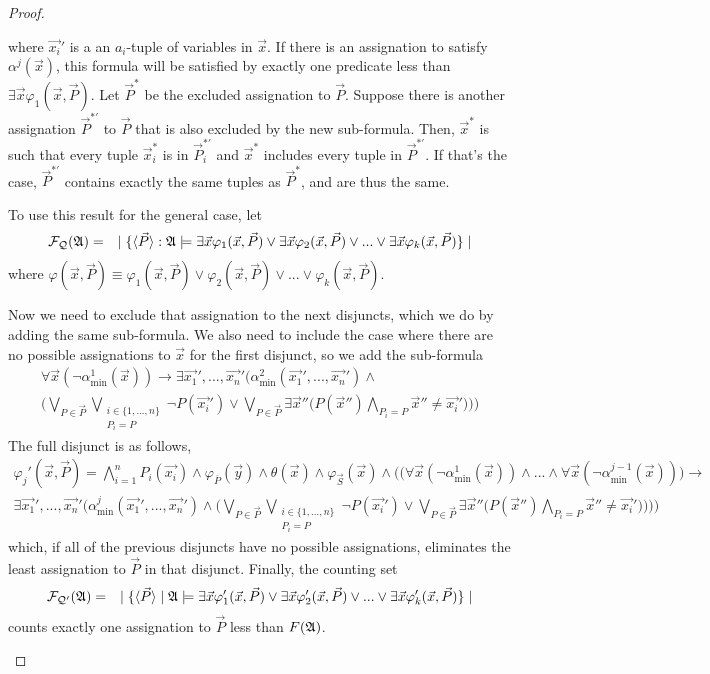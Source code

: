 \documentclass[12pt]{article}
\def\A{{\frak A}}
\def\Q{{\cal Q}}
\def\F{{\cal F}}
\def\P{\vec{P}}
\def\S{\vec{S}}
\def\x{\vec{x}}
\begin{document}
\begin{proof}
\begin{enumerate}
where $\vec{x_i}'$ is a an $a_i$-tuple of variables in $\x$. If there is an assignation to satisfy $\alpha^j(\x)$, this formula will be satisfied by exactly one predicate less than $\exists \x \varphi_1(\x,\P)$. Let $\P^*$ be the excluded assignation to $\P$. Suppose there is another assignation $\P^{*'}$ to $\P$ that is also excluded by the new sub-formula. Then, $\x^*$ is such that every tuple $\x_i^*$ is in $\P_i^{*'}$ and $\x^*$ includes every tuple in $\P^{*'}$. If that's the case, $\P^{*'}$ contains exactly the same tuples as $\P^*$, and are thus the same.

To use this result for the general case, let
\begin{eqnarray*}
\F_\Q(\A) &=& \mid \{ \langle\P\rangle :\A \models 
\exists \x \varphi_1(\x,\P) \vee
\exists \x \varphi_2(\x,\P) \vee
... \vee
\exists \x \varphi_k(\x,\P)
 \} \mid
\end{eqnarray*}
where $\varphi(\x,\P) \equiv \varphi_1(\x,\P) \vee \varphi_2(\x,\P) \vee ...  \vee \varphi_k(\x,\P) $.


Now we need to exclude that assignation to the next disjuncts, which we do by adding the same sub-formula. We also need to include the case where there are no possible assignations to $\x$ for the first disjunct, so we add the sub-formula
\begin{multline*}
\forall\x\left(\neg\alpha^1_{\min}(\x)\right) \to \exists\vec{x_1}',...,\vec{x_n}'\Bigg(\alpha^2_{\min}(\vec{x_1}',...,\vec{x_n}') \wedge \\
\bigg(\bigvee_{P\in\P}\bigvee_{\substack{i\in\{1,...,n\}\\P_i = P}}\neg P(\vec{x_i}') \vee \bigvee_{P\in\P} \exists \x''\Big( P(\x'') \bigwedge_{P_i = P} \x'' \neq \vec{x_i}'\Big) \bigg) \Bigg)
\end{multline*}
The full disjunct is as follows,
\begin{multline*}
\varphi_j'(\x,\P) = \bigwedge_{i=1}^n P_i(\vec{x_i}) \wedge \varphi_{\overline{P}}(\vec{y}) \wedge \theta(\x) \wedge \varphi_{\S}(\x) \wedge \Bigg(\Big(\forall\x\left(\neg\alpha^1_{\min}(\x)\right)\wedge ... \wedge \forall\x\left(\neg\alpha^{j-1}_{\min}(\x)\right)\Big) \to \\ 
\exists\vec{x_1}',...,\vec{x_n}'\Bigg(\alpha^j_{\min}(\vec{x_1}',...,\vec{x_n}') \wedge
\bigg(\bigvee_{P\in\P}\bigvee_{\substack{i\in\{1,...,n\}\\P_i = P}}\neg P(\vec{x_i}') \vee \bigvee_{P\in\P} \exists \x''\Big( P(\x'') \bigwedge_{P_i = P} \x'' \neq \vec{x_i}'\Big) \bigg) \Bigg) \Bigg)
\end{multline*}
which, if all of the previous disjuncts have no possible assignations, eliminates the least assignation to $\P$ in that disjunct. Finally, the counting set
\begin{eqnarray*}
\F_{\Q'}(\A) &=& \mid \{ \langle\P\rangle \mid \A \models 
\exists \x \varphi'_1(\x,\P) \vee
\exists \x \varphi'_2(\x,\P) \vee
... \vee
\exists \x \varphi'_k(\x,\P)
 \} \mid
\end{eqnarray*}
counts exactly one assignation to $\P$ less than $F(\A)$.


\end{enumerate}
\end{proof}
\end{document}
